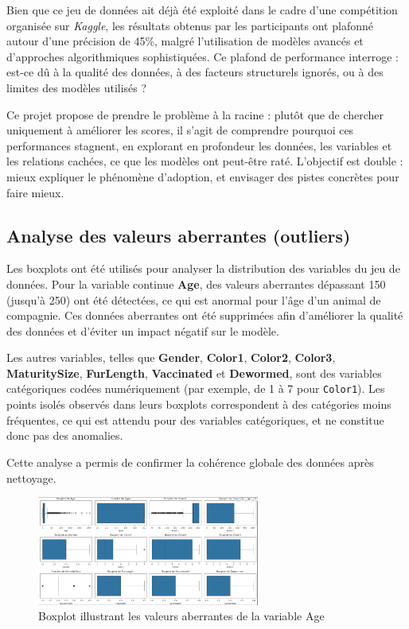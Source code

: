 \documentclass[a4paper,12pt]{article}
\begin{document}
Bien que ce jeu de données ait déjà été exploité dans le cadre d’une compétition organisée sur \textit{Kaggle}, les résultats obtenus par les participants ont plafonné autour d'une précision de 45\%, malgré l’utilisation de modèles avancés et d’approches algorithmiques sophistiquées. Ce plafond de performance interroge : est-ce dû à la qualité des données, à des facteurs structurels ignorés, ou à des limites des modèles utilisés ?

Ce projet propose de prendre le problème à la racine : plutôt que de chercher uniquement à améliorer les scores, il s'agit de comprendre pourquoi ces performances stagnent, en explorant en profondeur les données, les variables et les relations cachées, ce que les modèles ont peut-être raté. L’objectif est double : mieux expliquer le phénomène d’adoption, et envisager des pistes concrètes pour faire mieux.

\subsection{Analyse des valeurs aberrantes (outliers)}

Les boxplots ont été utilisés pour analyser la distribution des variables du jeu de données. Pour la variable continue \textbf{Age}, des valeurs aberrantes dépassant 150 (jusqu'à 250) ont été détectées, ce qui est anormal pour l'âge d'un animal de compagnie. Ces données aberrantes ont été supprimées afin d'améliorer la qualité des données et d'éviter un impact négatif sur le modèle.

Les autres variables, telles que \textbf{Gender}, \textbf{Color1}, \textbf{Color2}, \textbf{Color3}, \textbf{MaturitySize}, \textbf{FurLength}, \textbf{Vaccinated} et \textbf{Dewormed}, sont des variables catégoriques codées numériquement (par exemple, de 1 à 7 pour \texttt{Color1}). Les points isolés observés dans leurs boxplots correspondent à des catégories moins fréquentes, ce qui est attendu pour des variables catégoriques, et ne constitue donc pas des anomalies.

Cette analyse a permis de confirmer la cohérence globale des données après nettoyage.

\begin{figure}[H]
    \centering
    \includegraphics[width=0.65\textwidth]{boxplot_age_outliers.png}
    \caption{Boxplot illustrant les valeurs aberrantes de la variable Age}
    \label{fig:outliers_age}
\end{figure}
\end{document}
